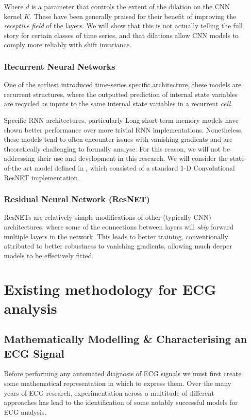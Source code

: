 \documentclass[9pt,conference]{IEEEtran}
\begin{document}
Where $d$ is a parameter that controls the extent of the dilation on the CNN kernel $K$. These have been generally praised for their benefit of improving the \textit{receptive field} \cite{wang2017dilated} of the layers. We will show that this is not actually telling the full story for certain classes of time series, and that dilations allow CNN models to comply more reliably with shift invariance. 

\subsubsection{Recurrent Neural Networks}
One of the earliest introduced time-series specific architecture, these models are recurrent structures, where the outputted prediction of internal state variables are recycled as inputs to the same internal state variables in a recurrent \textit{cell}.

Specific RNN architectures, particularly Long short-term memory models have shown better performance over more trivial RNN implementations. Nonetheless, these models tend to often encounter issues with vanishing gradients and are theoretically challenging to formally analyse. For this reason, we will not be addressing their use and development in this research. We will consider the state-of-the art model defined in \cite{stanfordML}, which consisted of a standard 1-D Convolutional ResNET implementation.


\subsubsection{Residual Neural Network (ResNET)}
ResNETs\cite{he2016deep} are relatively simple modifications of other (typically CNN) architectures, where some of the connections between layers will \textit{skip} forward multiple layers in the network. This leads to better training, conventionally attributed to better robustness to vanishing gradients, allowing much deeper models to be effectively fitted.




\section{Existing methodology for ECG analysis}

\subsection{Mathematically Modelling \& Characterising an ECG Signal}
Before performing any automated diagnosis of ECG signals we must first create some mathematical representation in which to express them. Over the many years of ECG research, experimentation across a multitude of different approaches has lead to the identification of some notably successful models for ECG analysis.
\end{document}
